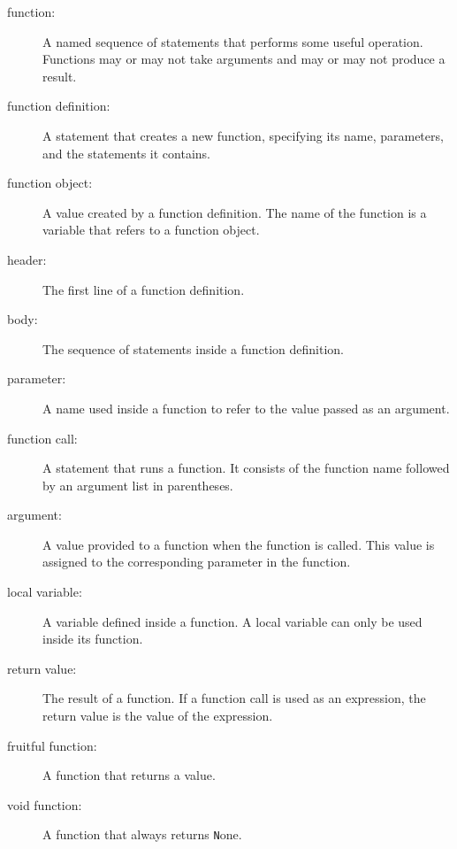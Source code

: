 \documentclass[
DIV=11,
fontsize=13,
twoside,
headinclude=false,
titlepage=firstiscover,
abstract=true,
headsepline=true,
footsepline=true,
chapterprefix=true, %
headings=big,
bibliography=totoc,%
captions=tableheading
]{scrbook}
\theoremstyle{definition}
\begin{document}
\begin{description}

\item[function:] A named sequence of statements that performs some
useful operation.  Functions may or may not take arguments and may or
may not produce a result.

\item[function definition:]  A statement that creates a new function,
specifying its name, parameters, and the statements it contains.

\item[function object:]  A value created by a function definition.
The name of the function is a variable that refers to a function
object.

\item[header:] The first line of a function definition.

\item[body:] The sequence of statements inside a function definition.

\item[parameter:] A name used inside a function to refer to the value
passed as an argument.

\item[function call:] A statement that runs a function. It
consists of the function name followed by an argument list in
parentheses.

\item[argument:]  A value provided to a function when the function is called.
This value is assigned to the corresponding parameter in the function.

\item[local variable:]  A variable defined inside a function.  A local
variable can only be used inside its function.

\item[return value:]  The result of a function.  If a function call
is used as an expression, the return value is the value of
the expression.

\item[fruitful function:] A function that returns a value.

\item[void function:] A function that always returns {\texttt None}.


\end{description}
\end{document}
